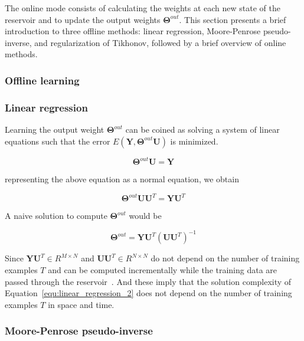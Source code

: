 \documentclass{WitsPhysicsReport}
\begin{document}
The online mode consists of calculating the weights at each new state of the reservoir and to update the output weights $\mathbf{\Theta}^{out}$. This section presents a brief introduction to three offline methods: linear regression, Moore-Penrose pseudo-inverse, and regularization of Tikhonov, followed by a brief overview of online methods.


\subsubsection{Offline learning}
\label{sec:offline_learning}
\subsubsection{Linear regression}
\label{sec:linear_regression}
Learning the output weight $\mathbf{\Theta}^{out}$ can be coined as solving a system of linear equations such that the error $E(\mathbf{Y},\mathbf{\Theta}^{out} \mathbf{U})$ is minimized.

\begin{equation}
\mathbf{\Theta}^{out} \mathbf{U}=\mathbf{Y} 
\label{equ:linear_regression_0}
\end{equation}

representing the above equation as a normal equation, we obtain 

\begin{equation}
 \mathbf{\Theta}^{out} \mathbf{U} \mathbf{U}^{T} = \mathbf{Y} \mathbf{U}^{T}
\label{equ:linear_regression_1}
\end{equation}

A naive solution to compute $\mathbf{\Theta}^{out}$ would be

\begin{equation}
 \mathbf{\Theta}^{out}  = \mathbf{Y} \mathbf{U}^{T} (\mathbf{U} \mathbf{U}^{T})^{-1}
\label{equ:linear_regression_2}
\end{equation}

Since $\mathbf{Y} \mathbf{U}^{T} \in  R^{M \times N}$  and $\mathbf{U} \mathbf{U}^{T}\in R^{N \times N}$ do not depend on the number of training examples $T$ and can be computed incrementally while the training data are passed through the reservoir~\cite{lukovsevivcius2009reservoir}. And these imply that the solution complexity of Equation~\ref{equ:linear_regression_2} does not depend on the number of training examples $T$ in space and time.


\subsubsection{Moore-Penrose pseudo-inverse }
\label{sec:Pseudo-inverse_Moore-Penrose}
\end{document}
